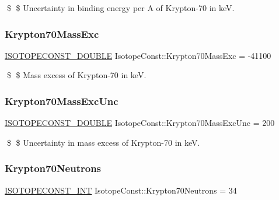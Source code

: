 \$ \$ Uncertainty in binding energy per A of Krypton-\/70 in keV. \mbox{\label{group___isotope_const-_krypton-_kr70_ga8513d208c46d82bbb26ed70aa05db4bc}} 
\subsubsection{\texorpdfstring{Krypton70\+Mass\+Exc}{Krypton70MassExc}}
{\footnotesize\ttfamily \mbox{\hyperlink{group___isotope_const-_macros_ga8f45a7272ce02c0b4c65c44636ed719a}{I\+S\+O\+T\+O\+P\+E\+C\+O\+N\+S\+T\+\_\+\+D\+O\+U\+B\+LE}} Isotope\+Const\+::\+Krypton70\+Mass\+Exc = -\/41100}

\$ \$ Mass excess of Krypton-\/70 in keV. \mbox{\label{group___isotope_const-_krypton-_kr70_gafae341bc5a6888760f47413a68947de8}} 
\subsubsection{\texorpdfstring{Krypton70\+Mass\+Exc\+Unc}{Krypton70MassExcUnc}}
{\footnotesize\ttfamily \mbox{\hyperlink{group___isotope_const-_macros_ga8f45a7272ce02c0b4c65c44636ed719a}{I\+S\+O\+T\+O\+P\+E\+C\+O\+N\+S\+T\+\_\+\+D\+O\+U\+B\+LE}} Isotope\+Const\+::\+Krypton70\+Mass\+Exc\+Unc = 200}

\$ \$ Uncertainty in mass excess of Krypton-\/70 in keV. \mbox{\label{group___isotope_const-_krypton-_kr70_ga6e90ff0bf4b9f846a22c5d99112fb224}} 
\subsubsection{\texorpdfstring{Krypton70\+Neutrons}{Krypton70Neutrons}}
{\footnotesize\ttfamily \mbox{\hyperlink{group___isotope_const-_macros_ga5f18360b3e99483a35c32d789e62621c}{I\+S\+O\+T\+O\+P\+E\+C\+O\+N\+S\+T\+\_\+\+I\+NT}} Isotope\+Const\+::\+Krypton70\+Neutrons = 34}


